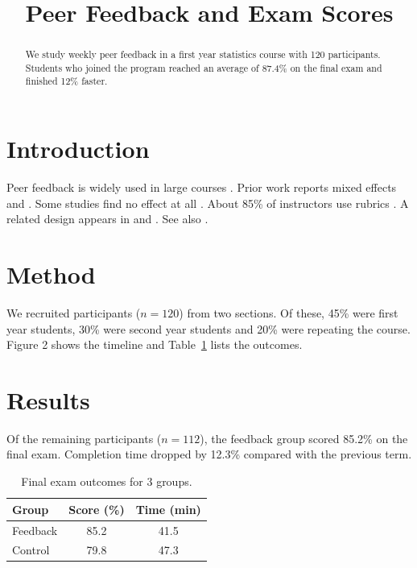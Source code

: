 \documentclass{article}
\begin{document}
\title{Peer Feedback and Exam Scores}
\maketitle

\begin{abstract}
We study weekly peer feedback in a first year statistics course with 120 participants.
Students who joined the program reached an average of 87.4\% on the final exam and finished 12\% faster.
\end{abstract}

\section{Introduction}
Peer feedback is widely used in large courses \citep[see][p.~3]{good2021, oldyear}.
Prior work reports mixed effects \citet{wrongtitle2020} and \parencite{nolink2017}.
Some studies find no effect at all \cite{fake2023,
  kim2022}.
About 85\% of instructors use rubrics \cite{missing2021}.
A related design appears in \cite{smith2019a} and \cite{smith2019b}.
See also \cite{kim2022b, chen2020, noyear, badoi2020, subtitled2019}.

\section{Method}
We recruited participants ($n = 120$) from two sections.
Of these, 45\% were first year students, 30\% were second year students and 20\% were repeating the course.
Figure 2 shows the timeline and Table~\ref{tab:main} lists the outcomes.

\section{Results}
Of the remaining participants ($n = 112$), the feedback group scored 85.2\% on the final exam.
Completion time dropped by 12.3\% compared with the previous term.

\begin{table}[t]
\caption{Final exam outcomes for 3 groups.}
\label{tab:main}
\begin{tabular}{lcc}
\toprule
Group & Score (\%) & Time (min) \\
\midrule
Feedback & 85.2 & 41.5 \\
Control & 79.8 & 47.3 \\
\bottomrule
\end{tabular}
\end{table}



\end{document}
